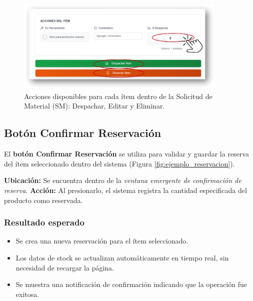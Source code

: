 \begin{figure}[H]
    \centering
    \includegraphics[width=0.9\textwidth]{imgs/Almacen_General/Procesamiento_SM/accionesitem.png}
    \caption{Acciones disponibles para cada ítem dentro de la Solicitud de Material (SM): Despachar, Editar y Eliminar.}
    \label{fig:acciones_item}
\end{figure}


\subsection{Botón Confirmar Reservación}

\vspace{-0.5em} %

El \textbf{botón Confirmar Reservación} se utiliza para validar y guardar la reserva del ítem seleccionado dentro del sistema (Figura \ref{fig:ejemplo_reservacion}).  

\textbf{Ubicación:} Se encuentra dentro de la \textit{ventana emergente de confirmación de reserva}.  
\textbf{Acción:} Al presionarlo, el sistema registra la cantidad especificada del producto como reservada.  

\subsubsection*{Resultado esperado}
\begin{itemize}
    \item Se crea una nueva reservación para el ítem seleccionado.
    \item Los datos de stock se actualizan automáticamente en tiempo real, sin necesidad de recargar la página.
    \item Se muestra una notificación de confirmación indicando que la operación fue exitosa.
\end{itemize}

